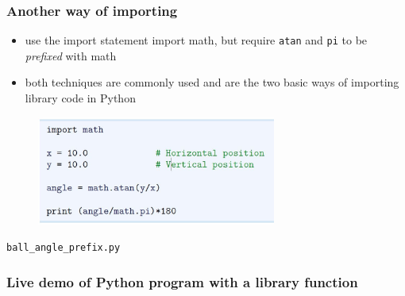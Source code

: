 \documentclass[14pt]{beamer}
\newcommand\red[1]{{\color{red} #1}}
\begin{document}

\begin{frame}[fragile]
\frametitle{Another way of importing}
\begin{itemize}
\item use the import statement import math, but require \texttt{atan} and \texttt{pi} to be \red{\emph{prefixed}} with math
\item both techniques are commonly used and are the two basic ways of importing library code in Python
\end{itemize}
\begin{figure}[ht]
	\centering
	\includegraphics[width=0.7\textwidth]{figures/LLp14}
\end{figure}
\vspace*{-5mm}
\begin{center}
\texttt{ball\_angle\_prefix.py}
\end{center}

\end{frame}


\begin{frame}[fragile]
\frametitle{Live demo of Python program with a library function}

\end{frame}

\end{document}
